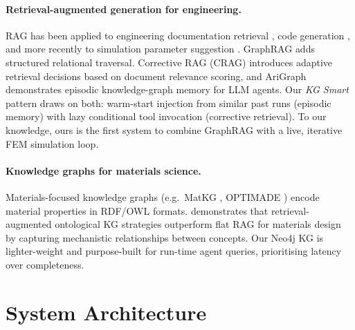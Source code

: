 \documentclass[twocolumn]{article}
\begin{document}
\paragraph{Retrieval-augmented generation for engineering.}
RAG \citep{lewis2020rag} has been applied to engineering documentation
retrieval \citep{liao2023rag}, code generation \citep{gao2023rag}, and more
recently to simulation parameter suggestion \citep{yang2024rag}.  GraphRAG
\citep{edge2024graphrag} adds structured relational traversal.
Corrective RAG (CRAG) \citep{yan2024crag} introduces adaptive retrieval
decisions based on document relevance scoring, and AriGraph
\citep{arigraph2024} demonstrates episodic knowledge-graph memory for LLM
agents.  Our \emph{KG Smart} pattern draws on both: warm-start injection
from similar past runs (episodic memory) with lazy conditional tool
invocation (corrective retrieval).  To our knowledge, ours is the first
system to combine GraphRAG with a live, iterative FEM simulation loop.

\paragraph{Knowledge graphs for materials science.}
Materials-focused knowledge graphs (e.g.\ MatKG \citep{venugopal2022matkg},
OPTIMADE \citep{andersen2021optimade}) encode material properties in RDF/OWL
formats.  \citet{buehler2024mechgpt} demonstrates that retrieval-augmented
ontological KG strategies outperform flat RAG for materials design by
capturing mechanistic relationships between concepts.
Our Neo4j KG is lighter-weight and purpose-built for run-time
agent queries, prioritising latency over completeness.

\section{System Architecture}
\label{sec:system}
\end{document}
